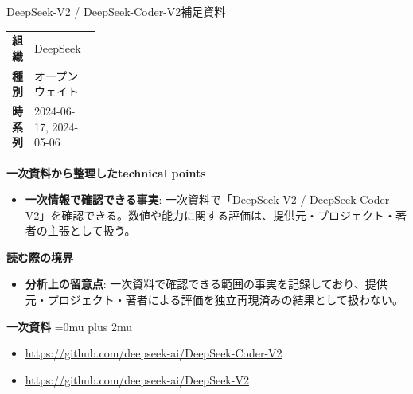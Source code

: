 \begin{technicalnote}{DeepSeek-V2 / DeepSeek-Coder-V2}{補足資料}
\begingroup
\begin{tabularx}{\linewidth}{@{}>{\bfseries}p{0.22\linewidth}X@{}}
組織 & DeepSeek \\
種別 & オープンウェイト \\
時系列 & 2024-06-17, 2024-05-06 \\
\end{tabularx}
\smallskip
{\bfseries 一次資料から整理したtechnical points}
\begin{itemize}[leftmargin=1.5em,itemsep=0.35em]
\item \textbf{一次情報で確認できる事実}: 一次資料で「DeepSeek-V2 / DeepSeek-Coder-V2」を確認できる。数値や能力に関する評価は、提供元・プロジェクト・著者の主張として扱う。
\end{itemize}
\begin{minipage}{\linewidth}
{\bfseries 読む際の境界}
\begin{itemize}[leftmargin=1.5em,itemsep=0.35em]
\item \textbf{分析上の留意点}: 一次資料で確認できる範囲の事実を記録しており、提供元・プロジェクト・著者による評価を独立再現済みの結果として扱わない。
\end{itemize}
\begin{samepage}
{\bfseries 一次資料}
\begingroup\sloppy
\Urlmuskip=0mu plus 2mu\relax
\begin{itemize}[leftmargin=1.5em,itemsep=0.25em]
\item {\scriptsize\url{https://github.com/deepseek-ai/DeepSeek-Coder-V2}}
\item {\scriptsize\url{https://github.com/deepseek-ai/DeepSeek-V2}}
\end{itemize}
\endgroup
\end{samepage}
\end{minipage}
\endgroup
\end{technicalnote}
\medskip
